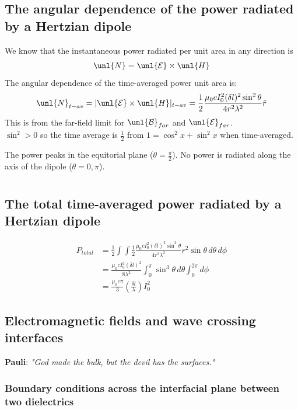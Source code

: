 \documentclass[a4paper, 11pt, normalem]{report}
\newcommand\E{\mathcal{E}}
\newcommand\uE{\unl{\E}}
\newcommand\B{\mathcal{B}}
\newcommand\uB{\unl{\B}}
\newcommand\hr{\hat{r}}
\newcommand\lam{\lambda}
\begin{document}
\section{The angular dependence of the power radiated by a Hertzian dipole}
We know that the instantaneous power radiated per unit area in any direction is
\begin{equation}
	\unl{N} = \uE\times\unl{H}
\end{equation}
The angular dependence of the time-averaged power unit area is:
\begin{equation}
	\unl{N}_{t-av} = |\uE\times\unl{H}|_{t-av} = \frac{1}{2}\frac{\mu_0cI_0^2(\delta l)^2\sin^2\theta}{4r^2\lam^2}\hr
\end{equation}
This is from the far-field limit for $\uB_{far}$ and $\uE_{far}$. \\
$\sin^2 > 0$ so the time average is $\frac{1}{2}$ from $1 = \cos^2x + \sin^2x$ when time-averaged.

The power peaks in the equitorial plane ($\theta = \frac{\pi}{2}$).
No power is radiated along the axis of the dipole ($\theta = 0,\pi$).

\chapter{}
\section{The total time-averaged power radiated by a Hertzian dipole}
\begin{align}
	P_{total} &= \frac{1}{2}\int\int \frac{1}{2}\frac{\mu_0cI_0^2(\delta l)^2\sin^2\theta}{4r^2\lam^2}r^2\sin\theta\,d\theta\,d\phi \\
	          &= \frac{\mu_0cI_0^2(\delta l)^2}{8\lam^2}\int_0^\pi \sin^3\theta\,d\theta \int_0^{2\pi} d\phi \\
           	  &= \frac{\mu_0c\pi}{3}\left(\frac{\delta l}{\lam}\right)I_0^2
\end{align}

\section{Electromagnetic fields and wave crossing interfaces}
\textbf{Pauli}: \emph{"God made the bulk, but the devil has the surfaces."}

\subsection{Boundary conditions across the interfacial plane between two dielectrics}
\end{document}
